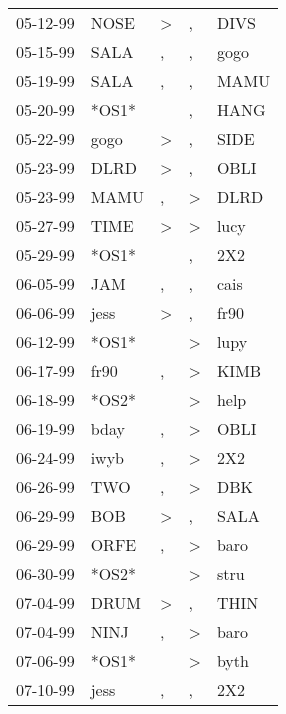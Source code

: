 \begin{supertabular}{lllll}
 05-12-99 &   NOSE &     \textgreater &                , &   DIVS \\
 05-15-99 &   SALA &                , &                , &   gogo \\
 05-19-99 &   SALA &                , &                , &   MAMU \\
 05-20-99 &  *OS1* &                  &                , &   HANG \\
 05-22-99 &   gogo &     \textgreater &                , &   SIDE \\
 05-23-99 &   DLRD &     \textgreater &                , &   OBLI \\
 05-23-99 &   MAMU &                , &     \textgreater &   DLRD \\
 05-27-99 &   TIME &     \textgreater &     \textgreater &   lucy \\
 05-29-99 &  *OS1* &                  &                , &    2X2 \\
 06-05-99 &    JAM &                , &                , &   cais \\
 06-06-99 &   jess &     \textgreater &                , &   fr90 \\
 06-12-99 &  *OS1* &                  &     \textgreater &   lupy \\
 06-17-99 &   fr90 &                , &     \textgreater &   KIMB \\
 06-18-99 &  *OS2* &                  &     \textgreater &   help \\
 06-19-99 &   bday &                , &     \textgreater &   OBLI \\
 06-24-99 &   iwyb &                , &     \textgreater &    2X2 \\
 06-26-99 &    TWO &                , &     \textgreater &    DBK \\
 06-29-99 &    BOB &     \textgreater &                , &   SALA \\
 06-29-99 &   ORFE &                , &     \textgreater &   baro \\
 06-30-99 &  *OS2* &                  &     \textgreater &   stru \\
 07-04-99 &   DRUM &     \textgreater &                , &   THIN \\
 07-04-99 &   NINJ &                , &     \textgreater &   baro \\
 07-06-99 &  *OS1* &                  &     \textgreater &   byth \\
 07-10-99 &   jess &                , &                , &    2X2 \\

\end{supertabular}
